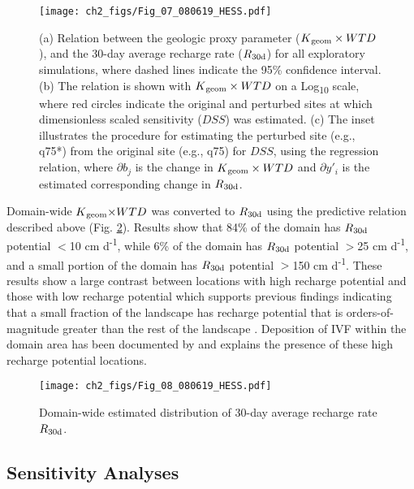 \begin{figure}[t]
\centering
\texttt{[image: ch2\_figs/Fig\_07\_080619\_HESS.pdf]}
\caption{(a) Relation between the geologic proxy parameter ($K\textsubscript{geom} \times WTD$), and the 30-day average recharge rate ($R\textsubscript{30d}$) for all exploratory simulations, where dashed lines indicate the 95\% confidence interval. (b) The relation is shown with $K\textsubscript{geom} \times WTD$ on a Log\textsubscript{10} scale, where red circles indicate the original and perturbed sites at which dimensionless scaled sensitivity ($DSS$) was estimated. (c) The inset illustrates the procedure for estimating the perturbed site (e.g., q75*) from the original site (e.g., q75) for $DSS$, using the regression relation, where $\partial b_j$ is the change in $K\textsubscript{geom} \times WTD$ and $\partial y'_i$ is the estimated corresponding change in $R\textsubscript{30d}$.}
\label{fig:proxy_par_relation}
\end{figure}

Domain-wide $K\textsubscript{geom}{\times}WTD$ was converted to $R\textsubscript{30d}$ using the predictive relation described above (Fig. \ref{fig:rech_extrapolation}). Results show that 84\% of the domain has $R\textsubscript{30d}$ potential $<$10 cm d\textsuperscript{-1}, while 6\% of the domain has $R\textsubscript{30d}$ potential $>$25 cm d\textsuperscript{-1}, and a small portion of the domain has $R\textsubscript{30d}$ potential $>$150 cm d\textsuperscript{-1}. These results show a large contrast between locations with high recharge potential and those with low recharge potential which supports previous findings indicating that a small fraction of the landscape has recharge potential that is orders-of-magnitude greater than the rest of the landscape \citep{maples_2019,fleckenstein2006river}. Deposition of IVF within the domain area has been documented by \cite{meirovitz2010thesis} and explains the presence of these high recharge potential locations.

\begin{figure}[t]
\centering
\texttt{[image: ch2\_figs/Fig\_08\_080619\_HESS.pdf]}
\caption{Domain-wide estimated distribution of 30-day average recharge rate $R\textsubscript{30d}$.}
\label{fig:rech_extrapolation}
\end{figure}

\subsection{Sensitivity Analyses} \label{ssec:R_sensitivty_analyses}

